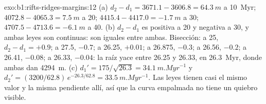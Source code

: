 \begin{solution}{exo:b1:rifts-ridges-margins:12}
(a) $d_2 - d_1 = 3671.1 - 3606.8 = \qty{64.3}{m}$ a \qty{10}{Myr};
$4072.8 - 4065.3 = \qty{7.5}{m}$ a 20; $4415.4 - 4417.0 = \qty{-1.7}{m}$ a
30; $4707.5 - 4713.6 = \qty{-6.1}{m}$ a 40. (b) $d_2 - d_1$ es positiva a 20
y negativa a 30, y ambas leyes son continuas: son iguales entre ambas.
Bisección: a 25, $d_2 - d_1 = +0.9$; a 27.5, $-0.7$; a 26.25, $+0.01$; a
26.875, $-0.3$; a 26.56, $-0.2$; a 26.41, $-0.08$; a 26.33, $-0.04$: la
raíz yace entre 26.25 y 26.33, en \qty{26.3}{Myr}, donde ambas dan
\qty{4294}{m}. (c) $d_1' = 175/\sqrt{26.3} = \qty{34.1}{m.Myr^{-1}}$ y
$d_2' = (3200/62.8)\,e^{-26.3/62.8} = \qty{33.5}{m.Myr^{-1}}$. Las leyes tienen
casi el mismo valor y la misma pendiente allí, así que la curva empalmada no tiene
un quiebro visible.
\end{solution}

